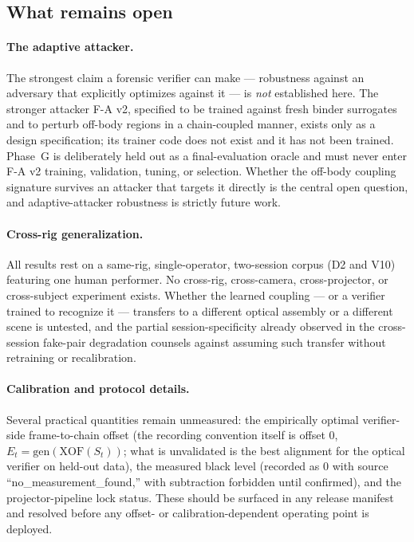 \subsection{What remains open}

\paragraph{The adaptive attacker.}
The strongest claim a forensic verifier can make --- robustness against an adversary that explicitly optimizes against it --- is \emph{not} established here. The stronger attacker F-A v2, specified to be trained against fresh binder surrogates and to perturb off-body regions in a chain-coupled manner, exists only as a design specification; its trainer code does not exist and it has not been trained. Phase~G is deliberately held out as a final-evaluation oracle and must never enter F-A v2 training, validation, tuning, or selection. Whether the off-body coupling signature survives an attacker that targets it directly is the central open question, and adaptive-attacker robustness is strictly future work.

\paragraph{Cross-rig generalization.}
All results rest on a same-rig, single-operator, two-session corpus (D2 and V10) featuring one human performer. No cross-rig, cross-camera, cross-projector, or cross-subject experiment exists. Whether the learned coupling --- or a verifier trained to recognize it --- transfers to a different optical assembly or a different scene is untested, and the partial session-specificity already observed in the cross-session fake-pair degradation counsels against assuming such transfer without retraining or recalibration.

\paragraph{Calibration and protocol details.}
Several practical quantities remain unmeasured: the empirically optimal verifier-side frame-to-chain offset (the recording convention itself is offset $0$, $E_t = \mathrm{gen}(\mathrm{XOF}(S_t))$; what is unvalidated is the best alignment for the optical verifier on held-out data), the measured black level (recorded as $0$ with source ``no\_measurement\_found,'' with subtraction forbidden until confirmed), and the projector-pipeline lock status. These should be surfaced in any release manifest and resolved before any offset- or calibration-dependent operating point is deployed.

